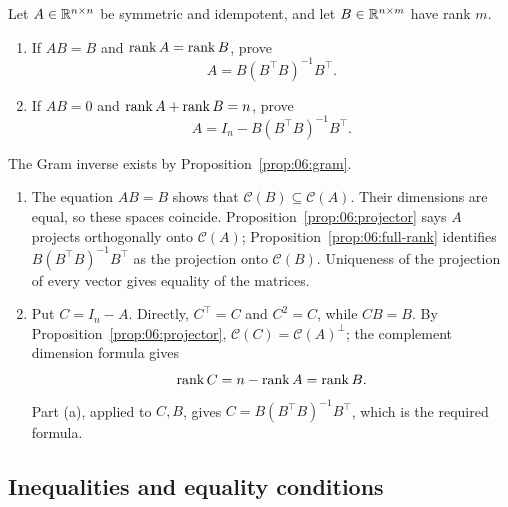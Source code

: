 \begin{problem}\label{ex:06:projection-criteria}
Let \(A\in\mathbb R^{n\times n}\) be symmetric and idempotent, and let
\(B\in\mathbb R^{n\times m}\) have rank \(m\).
\begin{enumerate}
\item If \(AB=B\) and \(\operatorname{rank} A=\operatorname{rank} B\), prove
\[
A=B(B^\top B)^{-1}B^\top.
\]
\item If \(AB=0\) and \(\operatorname{rank} A+\operatorname{rank} B=n\), prove
\[
A=I_n-B(B^\top B)^{-1}B^\top.
\]
\end{enumerate}
\end{problem}
\begin{solution}
The Gram inverse exists by Proposition~\ref{prop:06:gram}.
\begin{enumerate}
\item The equation \(AB=B\) shows that \(\mathcal C(B)\subseteq\mathcal C(A)\).
Their dimensions are equal, so these spaces coincide.
Proposition~\ref{prop:06:projector} says \(A\) projects orthogonally
onto \(\mathcal C(A)\); Proposition~\ref{prop:06:full-rank} identifies
\(B(B^\top B)^{-1}B^\top\) as the projection onto \(\mathcal C(B)\).
Uniqueness of the projection of every vector gives equality of the matrices.
\item Put \(C=I_n-A\). Directly, \(C^\top=C\) and \(C^2=C\), while
\(CB=B\).
By Proposition~\ref{prop:06:projector},
\(\mathcal C(C)=\mathcal C(A)^\perp\); the complement dimension formula gives
\[
\operatorname{rank} C=n-\operatorname{rank} A=\operatorname{rank} B.
\]
Part (a), applied to \(C,B\), gives
\(C=B(B^\top B)^{-1}B^\top\), which is the required formula.
\end{enumerate}
\end{solution}

\subsection*{Inequalities and equality conditions}

